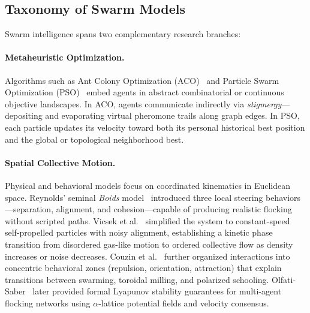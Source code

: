 \documentclass[10pt,twocolumn]{article}
\begin{document}
\subsection{Taxonomy of Swarm Models}
Swarm intelligence spans two complementary research branches:

\paragraph{Metaheuristic Optimization.} Algorithms such as Ant Colony Optimization (ACO)~\cite{dorigo1996ant} and Particle Swarm Optimization (PSO)~\cite{kennedy1995particle} embed agents in abstract combinatorial or continuous objective landscapes. In ACO, agents communicate indirectly via \emph{stigmergy}---depositing and evaporating virtual pheromone trails along graph edges. In PSO, each particle updates its velocity toward both its personal historical best position and the global or topological neighborhood best.

\paragraph{Spatial Collective Motion.} Physical and behavioral models focus on coordinated kinematics in Euclidean space. Reynolds' seminal \emph{Boids} model~\cite{reynolds1987flocks} introduced three local steering behaviors---separation, alignment, and cohesion---capable of producing realistic flocking without scripted paths. Vicsek et al.~\cite{vicsek1995novel} simplified the system to constant-speed self-propelled particles with noisy alignment, establishing a kinetic phase transition from disordered gas-like motion to ordered collective flow as density increases or noise decreases. Couzin et al.~\cite{couzin2002collective} further organized interactions into concentric behavioral zones (repulsion, orientation, attraction) that explain transitions between swarming, toroidal milling, and polarized schooling. Olfati-Saber~\cite{olfati2006flocking} later provided formal Lyapunov stability guarantees for multi-agent flocking networks using $\alpha$-lattice potential fields and velocity consensus.
\end{document}
